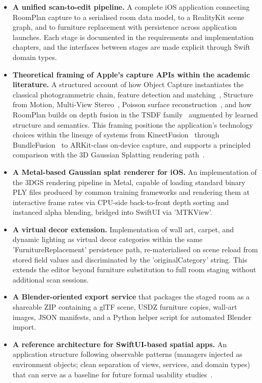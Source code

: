 \begin{itemize}
  \item \textbf{A unified scan-to-edit pipeline.}
    A complete iOS application connecting RoomPlan capture to a serialised
    room data model, to a RealityKit scene graph, and to furniture replacement
    with persistence across application launches. Each stage is documented in
    the requirements and implementation chapters, and the interfaces between
    stages are made explicit through Swift domain types.

  \item \textbf{Theoretical framing of Apple's capture APIs within the
    academic literature.}
    A structured account of how Object Capture instantiates the classical
    photogrammetric chain, feature detection and
    matching~\cite{lowe2004sift}, Structure from Motion, Multi-View
    Stereo~\cite{furukawa2010pmvs}, Poisson surface
    reconstruction~\cite{kazhdan2006poisson}, and how RoomPlan builds on
    depth fusion in the TSDF family~\cite{newcombe2011kinectfusion} augmented
    by learned structure and semantics. This framing positions the
    application's technology choices within the lineage of systems from
    KinectFusion~\cite{newcombe2011kinectfusion} through
    BundleFusion~\cite{DAN+17} to ARKit-class on-device capture, and supports
    a principled comparison with the 3D Gaussian Splatting rendering
    path~\cite{kerbl20233dgs}.

  \item \textbf{A Metal-based Gaussian splat renderer for iOS.}
    An implementation of the 3DGS rendering pipeline in Metal, capable of
    loading standard binary PLY files produced by common training frameworks
    and rendering them at interactive frame rates via CPU-side back-to-front
    depth sorting and instanced alpha blending, bridged into SwiftUI via
   'MTKView'.

  \item \textbf{A virtual decor extension.}
    Implementation of wall art, carpet, and dynamic lighting as virtual decor
    categories within the same 'FurnitureReplacement' persistence path, re-materialised
    on scene reload from stored field values and discriminated by the
    'originalCategory' string. This extends the editor beyond furniture
    substitution to full room staging without additional scan sessions.

  \item \textbf{A Blender-oriented export service} that packages the staged room as a
    shareable ZIP containing a glTF scene, USDZ furniture copies, wall-art images,
    JSON manifests, and a Python helper script for automated Blender import.

  \item \textbf{A reference architecture for SwiftUI-based spatial apps.}
    An application structure following observable patterns (managers injected
    as environment objects; clean separation of views, services, and domain
    types) that can serve as a baseline for future formal usability
    studies~\cite{kandil2021ux}.
\end{itemize}

